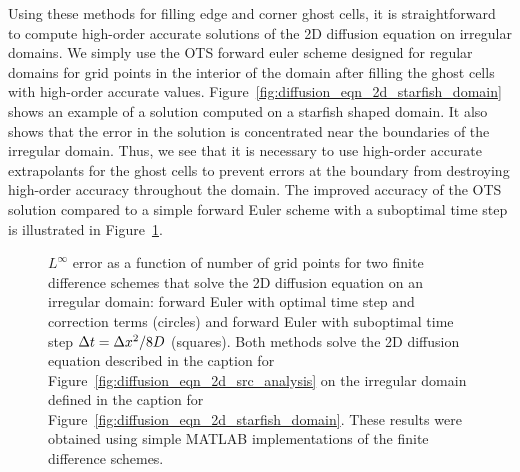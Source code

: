 \documentclass[oneeqnum,onefignum,onetabnum,onethmnum]{siamltex}
\begin{document}
Using these methods for filling edge and corner ghost cells, it is 
straightforward to compute high-order accurate solutions of the 2D diffusion 
equation on irregular domains.  We simply use the OTS forward euler scheme 
designed for regular domains for grid points in the interior of the domain
after filling the ghost cells with high-order accurate values.  
Figure~\ref{fig:diffusion_eqn_2d_starfish_domain} shows an example of 
a solution computed on a starfish shaped domain.  It also shows that the 
error in the solution is concentrated near the boundaries of the irregular
domain.  Thus, we see that it is necessary to use high-order accurate 
extrapolants for the ghost cells to prevent errors at the boundary from 
destroying high-order accuracy throughout the domain.  The improved accuracy 
of the OTS solution compared to a simple forward Euler scheme with a 
suboptimal time step is illustrated in 
Figure~\ref{fig:diffusion_eqn_2d_starfish_error}. 

\begin{figure}[tb]
\begin{center}
\caption{$L^\infty$ error as a function of number of grid points for two
finite difference schemes that solve the 2D diffusion equation on an 
irregular domain: forward Euler with optimal time step and correction 
terms (circles) and forward Euler with suboptimal time step $\Delta t = \Delta x^2/8 D$
(squares).  Both methods solve the 2D diffusion equation described in the 
caption for Figure~\ref{fig:diffusion_eqn_2d_src_analysis} on the irregular
domain defined in the caption for 
Figure~\ref{fig:diffusion_eqn_2d_starfish_domain}.
These results were obtained using simple MATLAB implementations of the 
finite difference schemes.
}
\label{fig:diffusion_eqn_2d_starfish_error}
\end{center}
\end{figure}
\end{document}
